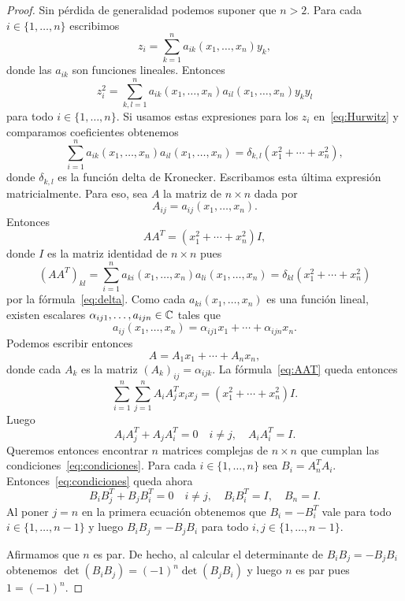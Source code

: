 \begin{proof}
	Sin pérdida de generalidad podemos suponer que $n>2$.  Para cada
	$i\in\{1,\dots,n\}$ escribimos 
	\[
		z_i=\sum_{k=1}^n a_{ik}(x_1,\dots,x_n)y_k,
	\]
	donde las $a_{ik}$ son funciones lineales. Entonces
	\[
		z_i^2=\sum_{k,l=1}^na_{ik}(x_1,\dots,x_n)a_{il}(x_1,\dots,x_n)y_ky_l
	\]
	para todo $i\in\{1,\dots,n\}$.  Si usamos estas expresiones para los $z_i$
	en~\eqref{eq:Hurwitz} y comparamos coeficientes obtenemos
	\begin{equation}
		\label{eq:delta}
		\sum_{i=1}^n a_{ik}(x_1,\dots,x_n)a_{il}(x_1,\dots,x_n)=\delta_{k,l}(x_1^2+\cdots+x_n^2),
	\end{equation}
	donde $\delta_{k,l}$ es la función delta de Kronecker. Escribamos esta
	última expresión matricialmente. Para eso, 
	sea $A$ la matriz de $n\times n$ dada por
	\[
	A_{ij}=a_{ij}(x_1,\dots,x_n).
	\]
	Entonces 
	\begin{equation}
		\label{eq:AAT}
		AA^T=(x_1^2+\cdots+x_n^2)I,
	\end{equation}
	donde $I$ es la matriz identidad de $n\times n$ pues 
	\[
		(AA^T)_{kl}=\sum_{i=1}^na_{ki}(x_1,\dots,x_n)a_{li}(x_1,\dots,x_n)=\delta_{kl}(x_1^2+\cdots+x_n^2)
	\]
	por la fórmula~\eqref{eq:delta}. Como cada $a_{ki}(x_1,\dots,x_n)$ es una función lineal, 
	existen escalares $\alpha_{ij1},\dots,a_{ijn}\in\mathbb{C}$ tales que
	\[
		a_{ij}(x_1,\dots,x_n)=\alpha_{ij1}x_1+\cdots+\alpha_{ijn}x_n.
	\]
	Podemos escribir entonces 
	\[
		A=A_1x_1+\cdots+A_nx_n,
	\]
	donde cada $A_k$ es la matriz $(A_k)_{ij}=\alpha_{ijk}$. La fórmula~\eqref{eq:AAT} queda entonces
	\[
		\sum_{i=1}^n\sum_{j=1}^nA_iA_j^Tx_ix_j=(x_1^2+\cdots+x_n^2)I.
	\]
	Luego 
	\begin{equation}
		\label{eq:condiciones}
		A_iA_j^T+A_jA_i^T=0\quad i\ne j,\quad
		A_iA_i^T=I.
	\end{equation}
	Queremos entonces encontrar $n$ matrices complejas de $n\times n$ que
	cumplan las condiciones~\eqref{eq:condiciones}. Para cada $i\in\{1,\dots,n\}$ sea 
	$B_i=A_n^TA_i$. Entonces~\eqref{eq:condiciones} queda ahora 
	\[
		B_iB_j^T+B_jB_i^T=0\quad i\ne j,\quad
		B_iB_i^T=I,\quad
		B_n=I.
	\]
	Al poner $j=n$ en la primera ecuación obtenemos que $B_i=-B_i^T$ vale para
	todo $i\in\{1,\dots,n-1\}$ y luego $B_iB_j=-B_jB_i$ para todo
	$i,j\in\{1,\dots,n-1\}$. 

	Afirmamos que $n$ es par. De hecho, al calcular el determinante de
	$B_iB_j=-B_jB_i$ obtenemos $\det(B_iB_j)=(-1)^n\det(B_jB_i)$ y luego $n$ es
	par pues $1=(-1)^n$.


\end{proof}
